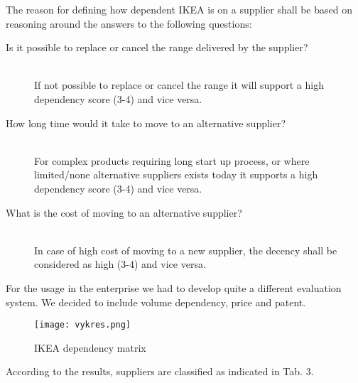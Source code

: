\documentclass[oneside,12pt]{article}%
\begin{document}
The reason for defining how dependent IKEA is on a supplier shall be based on reasoning around the answers to the following questions:

\begin{description}
  \item[Is it possible to replace or cancel the range delivered by the supplier? ] \hfill \\
  If not possible to replace or cancel the range it will support a high dependency score (3-4) and vice versa.

  \item[How long time would it take to move to an alternative supplier? ] \hfill \\
  For complex products requiring long start up process, or where limited/none alternative suppliers exists today it supports a high dependency score (3-4) and vice versa.

  \item[What is the cost of moving to an alternative supplier?] \hfill \\
  In case of high cost of moving to a new supplier, the decency shall be considered as high (3-4) and vice versa.

\end{description}

For the usage in the enterprise we had to develop quite a different evaluation system. We decided to include volume dependency, price and patent.


\begin{figure}[ht!]
  \texttt{[image: vykres.png]}
  \caption{IKEA dependency matrix}
\end{figure}


According to the results, suppliers are classified as indicated in Tab. 3.

\end{document}
